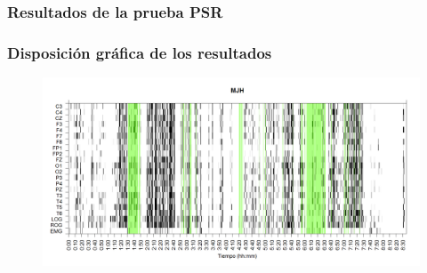\documentclass[11pt]{beamer}
\begin{document}

\begin{frame}[fragile]\frametitle{Resultados de la prueba PSR}
\begin{figure}
\scalebox{0.7}{\usebox{\caja}}
\end{figure}
\end{frame}


\begin{frame}\frametitle{Disposici\'on gr\'afica de los resultados}
\begin{figure}
\includegraphics[width=\textwidth]{./img_ejemplos/MJNNVIGILOS_est.png}
\end{figure}
\end{frame}

\end{document}
